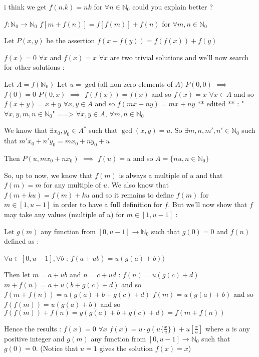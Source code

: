 \begin{solution}
	i think we get $ f(n.k) = nk$  for $ \forall n\in\mathbb{N}_{0}$
could you explain better ?
\end{solution}



\begin{solution}
	\begin{tcolorbox}$ f: \mathbb{N}_{0}\rightarrow\mathbb{N}_{0}$
$ f[m + f(n)] = f[f(m)] + f(n)$ for $ \forall m,n\in\mathbb{N}_{0}$\end{tcolorbox}

Let $ P(x,y)$ be the assertion $ f(x + f(y)) = f(f(x)) + f(y)$

$ f(x) = 0$ $ \forall x$ and $ f(x) = x$ $ \forall x$  are two trivial solutions and we'll now search for other solutions :

Let $ A = f(\mathbb N_0)$
Let $ u = \gcd($all non zero elements of $ A)$
$ P(0,0)$ $ \implies$ $ f(0) = 0$
$ P(0,x)$ $ \implies$ $ f(f(x)) = f(x)$ and so $ f(x) = x$ $ \forall x\in A$ and so $ f(x + y) = x + y$ $ \forall x,y\in A$ and so $ f(mx + ny) = mx + ny$ ** edited ** : "$ \forall x,y,m,n\in\mathbb N_0$" ==> $ \forall x,y\in A$, $ \forall m,n\in\mathbb N_0$

We know that $ \exists x_0,y_0\in A^*$ such that $ \gcd(x,y) = u$. 
So $ \exists m,n,m',n'\in\mathbb N_0$ such that $ m'x_0 + n'y_0 = mx_0 + ny_0 + u$

Then $ P(u,mx_0 + nx_0)$ $ \implies$ $ f(u) = u$ and so $ A = \{nu, n\in\mathbb N_0\}$

So, up to now, we know that $ f(m)$ is always a multiple of $ u$ and that $ f(m) = m$ for any multiple of $ u$.
We also know that $ f(m + ku) = f(m) + ku$ and so it remains to define $ f(m)$ for $ m\in[1,u - 1]$ in order to have a full definition for $ f$.
But we'll now show that $ f$ may take any values (multiple of $ u$) for $ m\in[1,u - 1]$ :

Let $ g(m)$ any function from $ [0,u - 1]\to\mathbb N_0$ such that $ g(0) = 0$ and $ f(n)$ defined as :

$ \forall a\in[0,u - 1],\forall b$ : $ f(a + ub) = u(g(a) + b))$

Then let $ m = a + ub$ and $ n = c + ud$ :
$ f(n) = u(g(c) + d)$
$ m + f(n) = a + u(b + g(c) + d)$ and so $ f(m + f(n)) = u(g(a) + b + g(c) + d)$
$ f(m) = u(g(a) + b)$ and so $ f(f(m)) = u(g(a) + b)$ and so $ f(f(m)) + f(n) = y(g(a) + b + g(c) + d) = f(m + f(n))$

Hence the results :
$ f(x) = 0$ $ \forall x$
$ f(x) = u\cdot g(u\{\frac xu\}) + u[\frac xu]$ where $ u$ is any positive integer and $ g(m)$ any function from $ [0,u - 1]\to\mathbb N_0$ such that $ g(0) = 0$.
(Notice that $ u = 1$ gives the solution $ f(x) = x$)
\end{solution}



